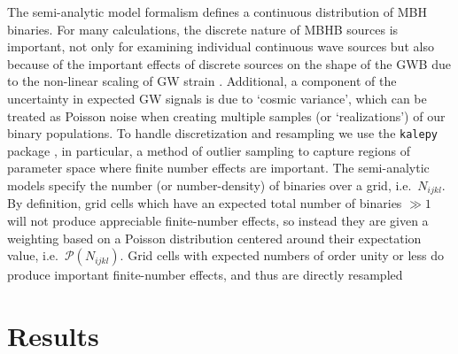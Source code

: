         The semi-analytic model formalism defines a continuous distribution of MBH binaries.  For many calculations, the discrete nature of MBHB sources is important, not only for examining individual continuous wave sources but also because of the important effects of discrete sources on the shape of the GWB due to the non-linear scaling of GW strain \citep{Sesana+2008}.  Additional, a component of the uncertainty in expected GW signals is due to `cosmic variance', which can be treated as Poisson noise when creating multiple samples (or `realizations') of our binary populations.  To handle discretization and resampling we use the \texttt{kalepy} package \citep{kalepy2021}, in particular, a method of outlier sampling to capture regions of parameter space where finite number effects are important.  The \holodeck{} semi-analytic models specify the number (or number-density) of binaries over a grid, i.e.~$N_{ijkl}$.  By definition, grid cells which have an expected total number of binaries $\gg 1$ will not produce appreciable finite-number effects, so instead they are given a weighting based on a Poisson distribution centered around their expectation value, i.e.~$\mathcal{P}(N_{ijkl})$.  Grid cells with expected numbers of order unity or less do produce important finite-number effects, and thus are directly resampled

\section{Results}
    \label{sec:res}




